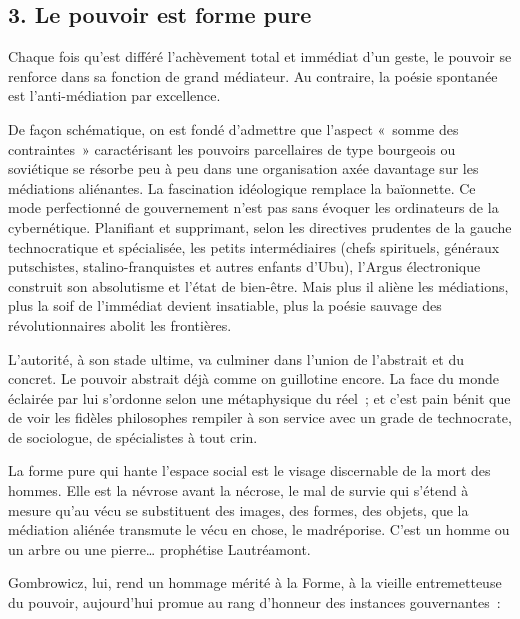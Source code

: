 \documentclass[french,twoside]{book} %
\begin{document}
\subsection[{3. Le pouvoir est forme pure}]{\textsc{3.} Le pouvoir est forme pure}
\noindent Chaque fois qu’est différé l’achèvement total et immédiat d’un geste, le pouvoir se renforce dans sa fonction de grand médiateur. Au contraire, la poésie spontanée est l’anti-médiation par excellence.\par
De façon schématique, on est fondé d’admettre que l’aspect « somme des contraintes » caractérisant les pouvoirs parcellaires de type bourgeois ou soviétique se résorbe peu à peu dans une organisation axée davantage sur les médiations aliénantes. La fascination idéologique remplace la baïonnette. Ce mode perfectionné de gouvernement n’est pas sans évoquer les ordinateurs de la cybernétique. Planifiant et supprimant, selon les directives prudentes de la gauche technocratique et spécialisée, les petits intermédiaires (chefs spirituels, généraux putschistes, stalino-franquistes et autres enfants d’Ubu), l’Argus électronique construit son absolutisme et l’état de bien-être. Mais plus il aliène les médiations, plus la soif de l’immédiat devient insatiable, plus la poésie sauvage des révolutionnaires abolit les frontières.\par
L’autorité, à son stade ultime, va culminer dans l’union de l’abstrait et du concret. Le pouvoir abstrait déjà comme on guillotine encore. La face du monde éclairée par lui s’ordonne selon une métaphysique du réel ; et c’est pain bénit que de voir les fidèles philosophes rempiler à son service avec un grade de technocrate, de sociologue, de spécialistes à tout crin.\par
La forme pure qui hante l’espace social est le visage discernable de la mort des hommes. Elle est la névrose avant la nécrose, le mal de survie qui s’étend à mesure qu’au vécu se substituent des images, des formes, des objets, que la médiation aliénée transmute le vécu en chose, le madréporise. C’est un homme ou un arbre ou une pierre… prophétise Lautréamont.\par
Gombrowicz, lui, rend un hommage mérité à la Forme, à la vieille entremetteuse du pouvoir, aujourd’hui promue au rang d’honneur des instances gouvernantes :\par
\end{document}
